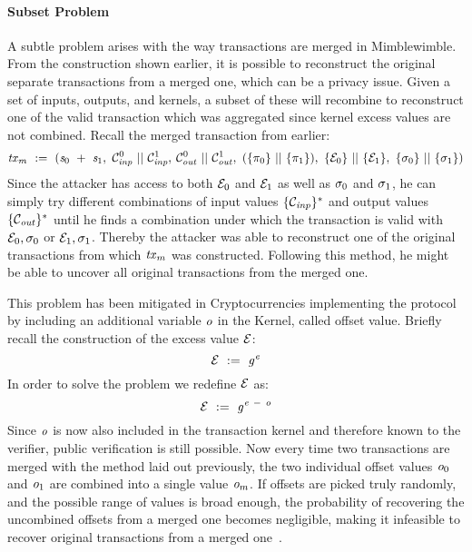 \paragraph{Subset Problem} \label{par:pre:mimblewimble:subset}
A subtle problem arises with the way transactions are merged in Mimblewimble.
From the construction shown earlier, it is possible to reconstruct the original separate transactions from a merged one, which can be a privacy issue.
Given a set of inputs, outputs, and kernels, a subset of these will recombine to reconstruct one of the valid transaction which was aggregated since kernel excess values are not combined.
Recall the merged transaction from earlier:
\[ \mathit{tx}_m ~:=~ (\mathit{s}_0 ~+~ \mathit{s}_1 ,~ \mathcal{C}_{\mathit{inp}}^0 ~||~ \mathcal{C}_{\mathit{inp}}^1,\:\mathcal{C}_{\mathit{out}}^0 ~||~ \mathcal{C}_{\mathit{out}}^1 ,~ (\{\pi_0\} ~||~ \{\pi_1\}) ,~
\{\mathcal{E}_0\} ~||~ \{\mathcal{E}_1\} ,~ \{\sigma_0\} ~||~ \{\sigma_1\}) \]
Since the attacker has access to both $\mathcal{E}_0$ and $\mathcal{E}_1$ as well as $\sigma_0$ and $\sigma_1$, he can simply try different combinations of input values $\{\mathcal{C}_{\mathit{inp}}\}^*$ and output values $\{\mathcal{C}_{\mathit{out}}\}^*$ until he finds a combination under which the transaction is valid with $\mathcal{E}_0, \sigma_0$ or $\mathcal{E}_1, \sigma_1$.
Thereby the attacker was able to reconstruct one of the original transactions from which $\mathit{tx}_m$ was constructed.
Following this method, he might be able to uncover all original transactions from the merged one.

This problem has been mitigated in Cryptocurrencies implementing the protocol by including an additional variable $\mathit{o}$ in the Kernel, called offset value.
Briefly recall the construction of the excess value $\mathcal{E}$:
\[ \mathcal{E} ~:=~ \mathit{g}^{\mathit{e}} \]
In order to solve the problem we redefine $\mathcal{E}$ as:
\[ \mathcal{E} ~:=~ \mathit{g}^{\mathit{e} ~-~ \mathit{o}} \]
Since $\mathit{o}$ is now also included in the transaction kernel and therefore known to the verifier, public verification is still possible.
Now every time two transactions are merged with the method laid out previously, the two individual offset values $\mathit{o}_0$ and $\mathit{o}_1$ are combined into a single value $\mathit{o}_m$.
If offsets are picked truly randomly, and the possible range of values is broad enough, the probability of recovering the uncombined offsets from a merged one becomes negligible, making it infeasible to recover original transactions from a merged one~\cite{poelstra2016mimblewimble}.


